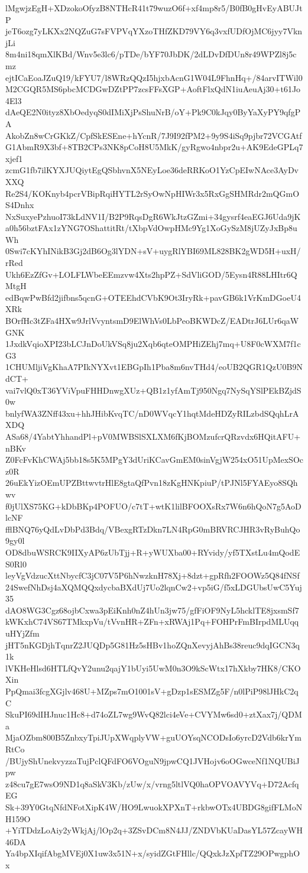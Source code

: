 lMgwjzEgH+XDzokoOfyzB8NTHcR41t79wuzO6f+xf4mp8r5/B0fB0gHvEyABUJtP
jeT6ozg7yLKXx2NQZuG7sFVPVqYXzoTHfZKD79VY6q3vxfUDfOjMC6jyy7VknjLi
8m4ni18qmXlKBd/Wnv5e3lc6/pTDe/bYF70JbDK/2dLDvDfDUn8r49WPZl8j5cmz
ejtICaEoaJZuQ19/kFYU7/l8WRzQQzI5hjxbAcnG1W04L9FhnHq+/84arvITWil0
M2CGQR5MS6pbcMCDGwDZtPP7zcsFFsXGP+AoftFlxQdN1iuAeuAj30+t61Jo4El3
dAeQE2N0ityz8XbOedyqS0dIMiXjPsShuNrB/oY+Pk9C0kJqy0ByYaXyPY9qfgPA
AkobZn8wCrGKkZ/CpfSkESEne+hYcnR/7J9I92fPM2+9y9S4iSq9pjbr72VCGAtf
G1AbmR9X3bf+8TB2CPs3NK8pCoH8U5MkK/gyRgwo4nbpr2u+AK9EdeGPLq7xjef1
zcmG1fb7ilKYXJUQiytEgQSbhvnX5NEyLoe36deRRKoO1YzCpEIwNAce3AyDvXXQ
Re2S4/KOKnyb4pcrVBipRqiHYTL2rSyOwNpHIWr3x5RxGgSHMRdr2mQGmOS4Dnhx
NxSuxyePzhuoI73kLdNV1I/B2P9RqsDgR6WkJtzGZmi+34gysrf4eaEGJ6Uda9jK
a0h56bztFAx1zYNG7OShattitRt/tXbpVdOwpHMc9Yg1XoGySzM8jUZyJxBp8uWh
0Swi7cKYhINikB3Gj2dB6Og3lYDN+sV+uygRlYBI69ML828BK2gWD5H+uxH/rRed
Ukh6EzZfGv+LOLFLWbeEEmzvw4Xts2hpPZ+SdVliGOD/5Eysn4R88LHItr6QMtgH
edBqwPwBfd2jifbns5qcnG+OTEEhdCVbK9Ot3IryRk+pavGB6k1VrKmDGoeU4XRk
BOrfHc3tZFa4HXw9JrlVvyntsmD9ElWhVs0LbPeoBKWDcZ/EADtrJ6LUr6qaWGNK
1JxdkVqioXPI23bLCJnDoUkVSq8ju2Xqb6qteOMPHiZEhj7mq+U8F0cWXM7f1cG3
1CHUMljiVgKhaA7PIkNYXvt1EBGpIh1Pba8m6nvTHd4/eoUB2QGR1QzU0B9NdCT+
vai7vlQ0xT36YViVpuFHHDnwgXUz+QB1z1yfAmTj950Ngq7NySqYSlPEkBZjdS0w
bnlyfWA3ZNff43xu+hhJHibKvqTC/nD0WVqcY1hqtMdeHDZyRILzbdSQqhLrAXDQ
ASa68/4YabtYhhandPl+pV0MWBSlSXLXM6fKjBOMzufcrQRzvdx6HQitAFU+nBKv
Z0FcFvKhCWAj5bb18s5K5MPgY3dUriKCavGmEM0sinVgjW254xO51UpMexSOcz0R
26uEkYizOEmUPZBttwvtrHlE8gtaQfPvn18zKgHNKpiuP/tPJNl5FYAEyo8SQhwv
f0jUlXS75KG+kDbBKp4POFUO/c7tT+wtK1lilBFOOXsRx7W6n6hQoN7g5AoDlcNF
fflBNQ76yQdLvDbPd3Bdq/VBexgRTzDkn7LN4RpG0mBRVRCJHR3vRyBuhQo9gy0l
OD8dbuWSRCK9IIXyAP6zUbTjj+R+yWUXba00+RYvidy/yf5TXstLu4mQodES0Rl0
leyVgVdzucXttNbycfC3jC07V5P6hNwzknH78Xj+8dzt+gpRfh2FOOWz5Q84fNSf
24SwefNhDsj4aXQMQQxdycbaBXdUj7Uo2lqnCw2+vp5iG/f5xLDGUbsUwC5Yuj35
dAO8WG3Cgz68ojbCxwa3pEiKnh0nZ4hUn3jw75/gfFiOF9NyL5hcklTE8jxsmSf7
kWKxhC74VS67TMkxpVu/tVvnHR+ZFn+xRWAj1Pq+FOHPrFmBIrpdMLUqquHYjZfm
jHT5nKGDjhTqnrZ2JUQDp5G81Hz5sHBv1hoZQnXevyjAhBs38reuc9dqIGCN3q1k
lVKHeHlsd6HTLfQvY2unu2qajY1bUyi5UwM0n3O9kScWtx17hXkby7HK8/CKOXin
PpQmai3fcgXGjlv468U+MZps7mO1001sV+gDzp1sESMZg5F/n0lPiP98lJHkC2qC
SkuPI69dIHJnuc1Hc8+d74oZL7wg9WvQ82lci4eVe+CVYMw6sd0+ztXax7j/QDMa
MjaOZbm800B5ZnbxyTpiJUpXWqplyVW+guUOYsqNCODsIo6yrcD2Vdb6krYmRtCo
/BUjyShUnekvyzzaTujPclQFdFO6VOguN9jpwCQ1JVHojv6oOGwceNf1NQUBiJpw
z48cu7gE7wsO9ND1q8aSkV3Kb/zUw/x/vrng5ltlVQ0haOPVOAVYVq+D72AcfqEG
Sk+39Y0GtqNfdNFotXipK4W/HO9LwuokXPXnT+rkbwOTx4UBDG8gifFLMoNH159O
+YiTDdzLoAiy2yWkjAj/lOp2q+3ZSvDCm8N4JJ/ZNDVbKUaDasYL57ZcayWH46DA
Ya4bpXIqifAbgMVEj0X1uw3x51N+x/syidZGtFHllc/QQxkJzXpfTZ29OPwgphOx
